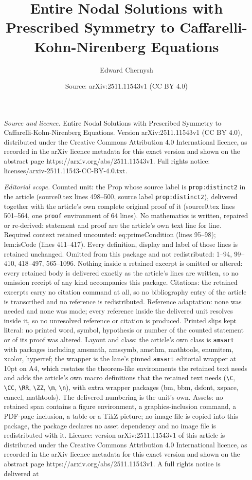 \documentclass[10pt,a4paper]{amsart}
\title[Entire Nodal Solutions with Prescribed Symmetry to Caffarell]{Entire Nodal Solutions with Prescribed Symmetry to Caffarelli-Kohn-Nirenberg Equations}
\author{Edward Chernysh}
\date{Source: arXiv:2511.11543v1 (CC BY 4.0)}
\begin{document}
\maketitle

\noindent\emph{Source and licence.} Entire Nodal Solutions with Prescribed Symmetry to Caffarelli-Kohn-Nirenberg Equations. Version arXiv:2511.11543v1 (CC BY 4.0), distributed under the Creative Commons Attribution 4.0 International licence, as recorded in the arXiv licence metadata for this exact version and shown on the abstract page https://arxiv.org/abs/2511.11543v1. Full rights notice: licenses/arxiv-2511.11543-CC-BY-4.0.txt.\par\smallskip

\noindent\textit{Editorial scope.} Counted unit: the Prop whose source label is \texttt{prop:distinct2} in the article (source0.tex lines 498--500, source label \texttt{prop:distinct2}), delivered together with the article's own complete original proof of it (source0.tex lines 501--564, one \texttt{proof} environment of 64 lines). No mathematics is written, repaired or re-derived: statement and proof are the article's own text line for line. Required context retained uncounted: eq:primeCondition (lines 95--98); lem:isCode (lines 411--417). Every definition, display and label of those lines is retained unchanged. Omitted from this package and not redistributed: 1--94, 99--410, 418--497, 565--1096. Nothing inside a retained excerpt is omitted or altered: every retained body is delivered exactly as the article's lines are written, so no omission receipt of any kind accompanies this package. Citations: the retained excerpts carry no citation command at all, so no bibliography entry of the article is transcribed and no reference is redistributed. Reference adaptation: none was needed and none was made; every reference inside the delivered unit resolves inside it, so no unresolved reference or citation is produced. Printed slips kept literal: no printed word, symbol, hypothesis or number of the counted statement or of its proof was altered. Layout and class: the article's own class is \texttt{amsart} with packages including amsmath, amssymb, amsthm, mathtools, enumitem, xcolor, hyperref; the wrapper is the lane's pinned \texttt{amsart} editorial wrapper at 10pt on A4, which restates the theorem-like environments the retained text needs and adds the article's own macro definitions that the retained text needs (\texttt{\textbackslash C}, \texttt{\textbackslash CC}, \texttt{\textbackslash RR}, \texttt{\textbackslash ZZ}, \texttt{\textbackslash m}, \texttt{\textbackslash n}), with extra wrapper packages (bm, bbm, dsfont, xspace, cancel, mathtools). The delivered numbering is the unit's own. Assets: no retained span contains a figure environment, a graphics-inclusion command, a PDF-page inclusion, a table or a TikZ picture; no image file is copied into this package, the package declares no asset dependency and no image file is redistributed with it. Licence: version arXiv:2511.11543v1 of this article is distributed under the Creative Commons Attribution 4.0 International licence, as recorded in the arXiv licence metadata for this exact version and shown on the abstract page https://arxiv.org/abs/2511.11543v1. A full rights notice is delivered at 
\end{document}
